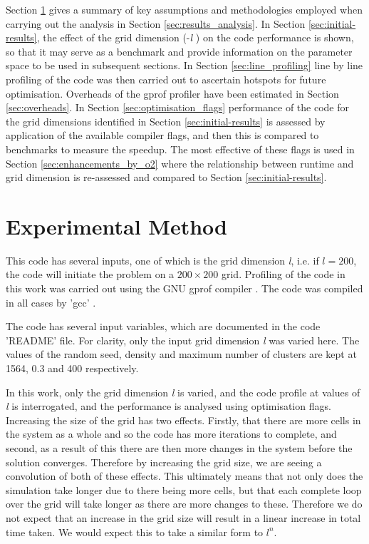 \documentclass[12pt,a4paper]{article}
\begin{document}
Section \ref{sec:method} gives a summary of key assumptions and methodologies employed when carrying out the analysis in Section \ref{sec:results_analysis}. In Section \ref{sec:initial-results}, the effect of the grid dimension (-{\em l} ) on the code performance is shown, so that it may serve as a benchmark and provide information on the parameter space to be used in subsequent sections. In Section \ref{sec:line_profiling} line by line profiling of the code was then carried out to ascertain hotspots for future optimisation. Overheads of the gprof profiler have been estimated in Section \ref{sec:overheads}.
In Section \ref{sec:optimisation_flags} performance of the code for the grid dimensions identified in Section \ref{sec:initial-results} is assessed by application of the available compiler flags, and then this is compared to benchmarks to measure the speedup. The most effective of these flags is used in Section \ref{sec:enhancements_by_o2} where the relationship between runtime and grid dimension is re-assessed and compared to Section \ref{sec:initial-results}.

\section{Experimental Method}\label{sec:method}

This code has several inputs, one of which is the grid dimension {\em l}, i.e. if $l=200$, the code will initiate the problem on a $200\times200$ grid. Profiling of the code in this work was carried out using the GNU gprof compiler \cite{ref:GNUgprof}. The code was compiled in all cases by 'gcc' \cite{ref:gcc}.

The code has several input variables, which are documented in the code 'README' file. For clarity, only the input grid dimension {\em l} was varied here. The values of  the random seed, density and maximum number of clusters are kept at 1564, 0.3 and 400 respectively.

In this work, only the grid dimension {\em l} is varied, and the code profile at values of {\em l} is interrogated, and the  performance is analysed using optimisation flags. 
Increasing the size of the grid has two effects. Firstly, that there are more cells in the system as a whole and so the code has more iterations to complete, and second, as a result of this there are then more changes in the system before the solution converges. Therefore by increasing the grid size, we are seeing a convolution of both of these effects. This ultimately means that not only does the simulation take longer due to there being more cells, but that each complete loop over the grid will take longer as there are more changes to these. Therefore we do not expect that an increase in the grid size will result in a linear increase in total time taken. We would expect this to take a similar form to $l^n$.
\end{document}
